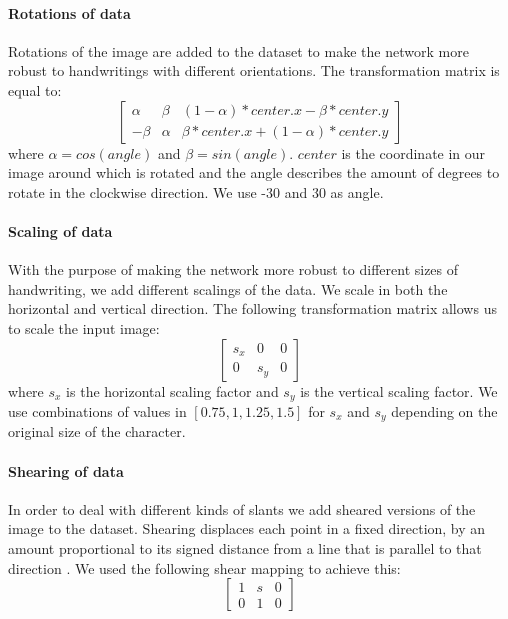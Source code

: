 \documentclass{article}
\begin{document}
\paragraph{Rotations of data}
Rotations of the image are added to the dataset to make the network more robust to handwritings with different orientations. The transformation matrix is equal to:
\begin{equation}
       \begin{bmatrix}
               \alpha & \beta & (1-\alpha)*center.x - \beta*center.y \\
               -\beta & \alpha & \beta*center.x + (1-\alpha)*center.y
       \end{bmatrix}
\end{equation}
where $\alpha = cos(angle)$ and $\beta = sin(angle)$. $center$ is the coordinate in our image around which is rotated and the angle describes the amount of degrees to rotate in the clockwise direction. We use -30 and 30 as angle.
\paragraph{Scaling of data}
With the purpose of making the network more robust to different sizes of handwriting, we add different scalings of the data. We scale in both the horizontal and vertical direction. The following transformation matrix allows us to scale the input image:
\begin{equation}
       \begin{bmatrix}
               s_x & 0 & 0  \\
               0 & s_y & 0
       \end{bmatrix}
\end{equation}
where $s_x$ is the horizontal scaling factor and $s_y$ is the vertical scaling factor.
We use combinations of values in $[0.75, 1, 1.25, 1.5]$ for $s_x$ and $s_y$ depending on the original size of the character.
\paragraph{Shearing of data}
In order to deal with different kinds of slants we add sheared versions of the image to the dataset.
Shearing displaces each point in a fixed direction, by an amount proportional to its signed distance from a line that is parallel to that direction \cite{Shear}. We used the following shear mapping to achieve this:
\begin{equation}
        \begin{bmatrix}
                1 & s & 0 \\
                0 & 1 & 0
        \end{bmatrix}
\end{equation}
\end{document}

